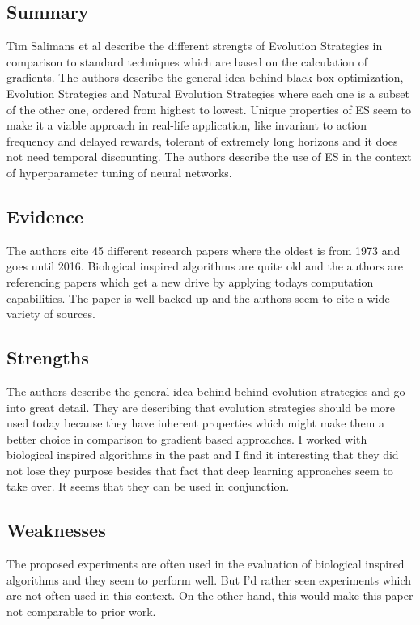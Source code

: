 \documentclass[a4paper]{article}
\begin{document}
\subsection{Summary}

Tim Salimans et al describe the different strengts of Evolution Strategies in comparison to standard techniques which are based on the calculation of gradients. The authors describe the general idea behind black-box optimization, Evolution Strategies and Natural Evolution Strategies where each one is a subset of the other one, ordered from highest to lowest. Unique properties of ES seem to make it a viable approach in real-life application, like invariant to action frequency and delayed rewards, tolerant of extremely long horizons and it does not need temporal discounting. The authors describe the use of ES in the context of hyperparameter tuning of neural networks.

\subsection{Evidence}


The authors cite 45 different research papers where the oldest is from 1973 and goes until 2016. Biological inspired algorithms are quite old and the authors are referencing papers which get a new drive by applying todays computation capabilities. The paper is well backed up and the authors seem to cite a wide variety of sources.

\subsection{Strengths}

The authors describe the general idea behind behind evolution strategies and go into great detail. They are describing that evolution strategies should be more used today because they have inherent properties which might make them a better choice in comparison to gradient based approaches. I worked with biological inspired algorithms in the past and I find it interesting that they did not lose they purpose besides that fact that deep learning approaches seem to take over. It seems that they can be used in conjunction.


\subsection{Weaknesses}

The proposed experiments are often used in the evaluation of biological inspired algorithms and they seem to perform well. But I'd rather seen experiments which are not often used in this context. On the other hand, this would make this paper not comparable to prior work.
\end{document}
